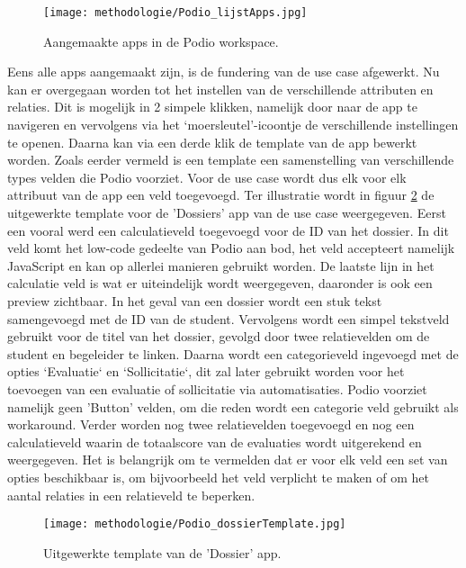 \begin{figure}[h]
    \centering
    \texttt{[image: methodologie/Podio\_lijstApps.jpg]}
    \caption{Aangemaakte apps in de Podio workspace.}
    \label{fig:meth_podio_lijstApps}
\end{figure}

Eens alle apps aangemaakt zijn, is de fundering van de use case afgewerkt. Nu kan er overgegaan worden tot het instellen van de verschillende attributen en relaties. Dit is mogelijk in 2 simpele klikken, namelijk door naar de app te navigeren en vervolgens via het ‘moersleutel’-icoontje de verschillende instellingen te openen. Daarna kan via een derde klik de template van de app bewerkt worden. Zoals eerder vermeld is een template een samenstelling van verschillende types velden die Podio voorziet. Voor de use case wordt dus elk voor elk attribuut van de app een veld toegevoegd. Ter illustratie wordt in figuur \ref{fig:meth_podio_dossierTemplate} de uitgewerkte template voor de 'Dossiers' app van de use case weergegeven. Eerst een vooral werd een calculatieveld toegevoegd voor de ID van het dossier. In dit veld komt het low-code gedeelte van Podio aan bod, het veld accepteert namelijk JavaScript en kan op allerlei manieren gebruikt worden. De laatste lijn in het calculatie veld is wat er uiteindelijk wordt weergegeven, daaronder is ook een preview zichtbaar. In het geval van een dossier wordt een stuk tekst samengevoegd met de ID van de student. Vervolgens wordt een simpel tekstveld gebruikt voor de titel van het dossier, gevolgd door twee relatievelden om de student en begeleider te linken. Daarna wordt een categorieveld ingevoegd met de opties `Evaluatie` en `Sollicitatie`, dit zal later gebruikt worden voor het toevoegen van een evaluatie of sollicitatie via automatisaties. Podio voorziet namelijk geen 'Button' velden, om die reden wordt een categorie veld gebruikt als workaround. Verder worden nog twee relatievelden toegevoegd en nog een calculatieveld waarin de totaalscore van de evaluaties wordt uitgerekend en weergegeven. Het is belangrijk om te vermelden dat er voor elk veld een set van opties beschikbaar is, om bijvoorbeeld het veld verplicht te maken of om het aantal relaties in een relatieveld te beperken. \\

\begin{figure}[h]
    \centering
    \texttt{[image: methodologie/Podio\_dossierTemplate.jpg]}
    \caption{Uitgewerkte template van de 'Dossier' app.}
    \label{fig:meth_podio_dossierTemplate}
\end{figure}

